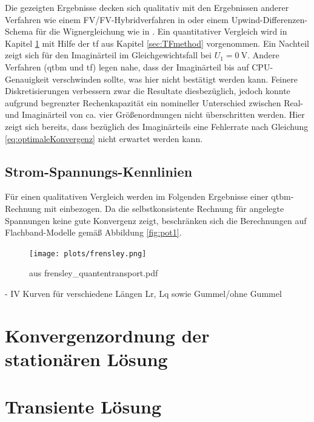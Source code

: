 Die gezeigten Ergebnisse decken sich qualitativ mit den Ergebnissen anderer Verfahren wie einem \ac{FV}/\ac{FV}-Hybridverfahren in \cite{lukas1} oder einem Upwind-Differenzen-Schema für die Wignergleichung wie in \cite{frensley2}. Ein quantitativer Vergleich wird in Kapitel \ref{sec:rates} mit Hilfe der \ac{tf} aus Kapitel \ref{sec:TFmethod} vorgenommen. Ein Nachteil zeigt sich für den Imaginärteil im Gleichgewichtsfall bei $U_1=\SI{0}{\volt}$. Andere Verfahren (\ac{qtbm} und \ac{tf}) legen nahe, dass der Imaginärteil bis auf CPU-Genauigkeit verschwinden sollte, was hier nicht bestätigt werden kann.
Feinere Diskretisierungen verbessern zwar die Resultate diesbezüglich, jedoch konnte aufgrund begrenzter Rechenkapazität ein nomineller Unterschied zwischen Real- und Imaginärteil von ca. vier Größenordnungen nicht überschritten werden. Hier zeigt sich bereits, dass bezüglich des Imaginärteils eine Fehlerrate nach Gleichung \eqref{eq:optimaleKonvergenz} nicht erwartet werden kann.

\subsection{Strom-Spannungs-Kennlinien}
Für einen qualitativen Vergleich werden im Folgenden Ergebnisse einer \ac{qtbm}-Rechnung mit einbezogen. Da die selbstkonsistente Rechnung für angelegte Spannungen keine gute Konvergenz zeigt, beschränken sich die Berechnungen auf Flachband-Modelle gemäß Abbildung \ref{fig:pot1}.

\begin{figure}
  \texttt{[image: plots/frensley.png]}
  \caption{aus frensley_quantentransport.pdf}
  \label{}
\end{figure}

- IV Kurven für verschiedene Längen Lr, Lq sowie Gummel/ohne Gummel

\section{Konvergenzordnung der stationären Lösung}\label{sec:rates}


\section{Transiente Lösung}\label{sec:transient}
